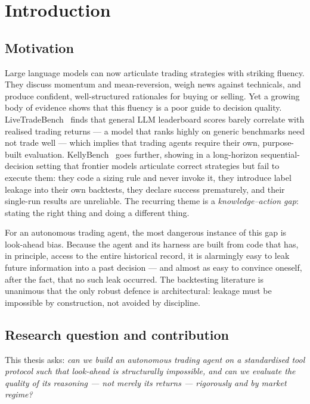 \chapter{Introduction}
\label{ch:intro}

\section{Motivation}

Large language models can now articulate trading strategies with striking fluency. They
discuss momentum and mean-reversion, weigh news against technicals, and produce confident,
well-structured rationales for buying or selling. Yet a growing body of evidence shows that
this fluency is a poor guide to decision quality. LiveTradeBench~\cite{livetradebench2025}
finds that general LLM leaderboard scores barely correlate with realised trading returns ---
a model that ranks highly on generic benchmarks need not trade well --- which implies that
trading agents require their own, purpose-built evaluation. KellyBench~\cite{kellybench2026}
goes further, showing in a long-horizon sequential-decision setting that frontier models
articulate correct strategies but fail to execute them: they code a sizing rule and never
invoke it, they introduce label leakage into their own backtests, they declare success
prematurely, and their single-run results are unreliable. The recurring theme is a
\emph{knowledge--action gap}: stating the right thing and doing a different thing.

For an autonomous trading agent, the most dangerous instance of this gap is look-ahead bias.
Because the agent and its harness are built from code that has, in principle, access to the
entire historical record, it is alarmingly easy to leak future information into a past
decision --- and almost as easy to convince oneself, after the fact, that no such leak
occurred. The backtesting literature is unanimous that the only robust defence is
architectural: leakage must be impossible by construction, not avoided by discipline.

\section{Research question and contribution}

This thesis asks: \emph{can we build an autonomous trading agent on a standardised tool
protocol such that look-ahead is structurally impossible, and can we evaluate the quality of
its reasoning --- not merely its returns --- rigorously and by market regime?}

